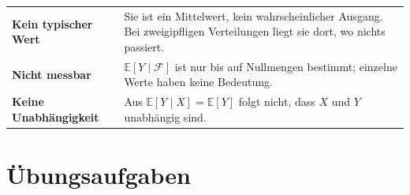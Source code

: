 \begin{warnung}
\begin{center}
{\small
\renewcommand{\arraystretch}{1.52}
\begin{tabular}{@{}P{2.6cm}P{6.0cm}@{}}
\toprule
\textbf{Kein typischer Wert} & Sie ist ein Mittelwert, kein wahrscheinlicher Ausgang. Bei zweigipfligen Verteilungen liegt sie dort, wo nichts passiert.\\
\textbf{Nicht messbar} & $\mathbb{E}[Y\mid\mathcal F]$ ist nur bis auf Nullmengen bestimmt; einzelne Werte haben keine Bedeutung.\\
\textbf{Keine Unabhängigkeit} & Aus $\mathbb{E}[Y\mid X] = \mathbb{E}[Y]$ folgt nicht, dass $X$ und $Y$ unabhängig sind.\\
\bottomrule
\end{tabular}}
\end{center}

\begin{center}
\begin{minipage}{0.88\textwidth}
\end{minipage}
\end{center}
\end{warnung}

\section{Übungsaufgaben}

